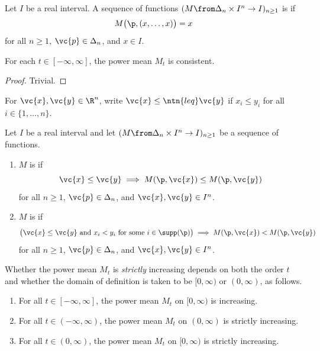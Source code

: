 \begin{defn}
Let $I$ be a real interval.  A sequence of functions $(M \from \Delta_n
\times I^n \to I)_{n \geq 1}$ is %
%
% 
if
\[
M\bigl(\p, (x, \ldots, x)\bigr) = x
\]
for all $n \geq 1$, $\vc{p} \in \Delta_n$, and $x \in I$.
\end{defn}

\begin{lemma}
% 
For each $t \in [-\infty, \infty]$, the power mean $M_t$ 
is consistent.
\end{lemma}

\begin{proof}
Trivial.
\end{proof}

For $\vc{x}, \vc{y} \in \R^n$, write $\vc{x} \leq\ntn{leq} \vc{y}$ if $x_i
\leq y_i$ for all $i \in \{1, \ldots, n\}$.

\begin{defn}
Let $I$ be a real interval and let $( M \from \Delta_n \times I^n \to I)_{n
  \geq 1}$ be a sequence of functions.
% 
\begin{enumerate}
\item
$M$ is %
% 
%
% 
if 
\[
\vc{x} \leq \vc{y}
\implies
M(\p, \vc{x}) \leq M(\p, \vc{y})
\]
for all $n \geq 1$, $\vc{p} \in \Delta_n$, and $\vc{x}, \vc{y} \in I^n$.

\item
$M$ is %
% 
%
%
% 
if 
\[
\bigl( \vc{x} \leq \vc{y} \text{ and } 
x_i < y_i \text{ for some } i \in \supp(\p) \bigr)
\implies
M(\p, \vc{x}) < M(\p, \vc{y})
\]
for all $n \geq 1$, $\vc{p} \in \Delta_n$, and $\vc{x}, \vc{y} \in I^n$. 
\end{enumerate}
\end{defn}

Whether the power mean $M_t$ is \emph{strictly} increasing depends on both
the order $t$ and whether the domain of definition is taken to be $[0,
  \infty)$ or $(0, \infty)$, as follows.

\begin{lemma}
\begin{enumerate}
\item
For all $t \in [-\infty, \infty]$, the power mean $M_t$ on $[0, \infty)$ is
  increasing. 

\item
For all $t \in (-\infty, \infty)$, the power mean $M_t$ on $(0, \infty)$ is
strictly increasing. 

\item
For all $t \in (0, \infty)$, the power mean $M_t$ on $[0, \infty)$ is strictly
  increasing.
\end{enumerate}
\end{lemma}

